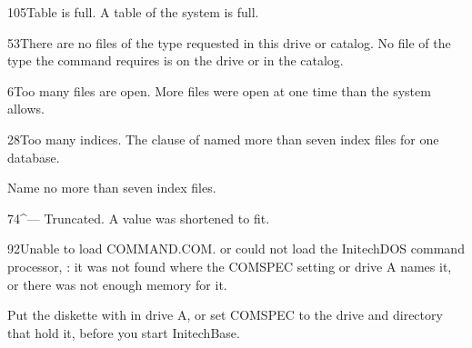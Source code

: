 \begin{XbaseMessageEntry}{105}{Table is full.}
A table of the system is full.
\end{XbaseMessageEntry}

\begin{XbaseMessageEntry}{53}{There are no files of the type requested in this drive or catalog.}
No file of the type the command requires is on the drive or in the catalog.
\end{XbaseMessageEntry}

\begin{XbaseMessageEntry}{6}{Too many files are open.}
More files were open at one time than the system allows.
\end{XbaseMessageEntry}

\begin{XbaseMessageEntry}{28}{Too many indices.}
The  clause of  named more than seven index files for one database.

Name no more than seven index files.
\end{XbaseMessageEntry}

\begin{XbaseMessageEntry}{74}{^--- Truncated.}
A value was shortened to fit.
\end{XbaseMessageEntry}

\begin{XbaseMessageEntry}{92}{Unable to load COMMAND.COM.}
 or \cmd{!} could not load the InitechDOS command processor, : it was not found where the COMSPEC setting or drive A names it, or there was not enough memory for it.

Put the diskette with  in drive A, or set COMSPEC to the drive and directory that hold it, before you start InitechBase.
\end{XbaseMessageEntry}

